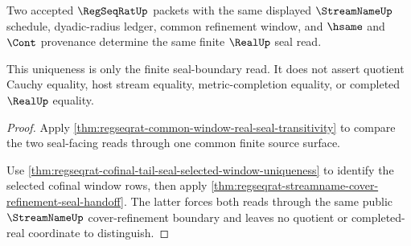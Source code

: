 \begin{theorem}\label{thm:regseqrat-real-seal-uniqueness-boundary}
Two accepted $\RegSeqRatUp$ packets with the same displayed $\StreamNameUp$
schedule, dyadic-radius ledger, common refinement window, and $\hsame$ and
$\Cont$ provenance determine the same finite $\RealUp$ seal read.

This uniqueness is only the finite seal-boundary read. It does not assert
quotient Cauchy equality, host stream equality, metric-completion equality, or
completed $\RealUp$ equality.
\end{theorem}
\begin{proof}
Apply \autoref{thm:regseqrat-common-window-real-seal-transitivity} to compare
the two seal-facing reads through one common finite source surface.

Use \autoref{thm:regseqrat-cofinal-tail-seal-selected-window-uniqueness} to
identify the selected cofinal window rows, then apply
\autoref{thm:regseqrat-streamname-cover-refinement-seal-handoff}. The latter
forces both reads through the same public $\StreamNameUp$ cover-refinement
boundary and leaves no quotient or completed-real coordinate to distinguish.
\end{proof}

